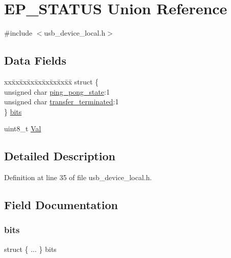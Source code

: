 \hypertarget{union_e_p___s_t_a_t_u_s}{}\section{E\+P\+\_\+\+S\+T\+A\+T\+US Union Reference}
\label{union_e_p___s_t_a_t_u_s}


{\ttfamily \#include $<$usb\+\_\+device\+\_\+local.\+h$>$}

\subsection*{Data Fields}
\begin{DoxyCompactItemize}
\item 
\begin{tabbing}
xx\=xx\=xx\=xx\=xx\=xx\=xx\=xx\=xx\=\kill
struct \{\\
\>unsigned char \mbox{\hyperlink{union_e_p___s_t_a_t_u_s_af0b1bd7b5767b174b8f055d94cac4bcc}{ping\_pong\_state}}:1\\
\>unsigned char \mbox{\hyperlink{union_e_p___s_t_a_t_u_s_a4a20792b6382277d34763fd0157c9f2e}{transfer\_terminated}}:1\\
\} \mbox{\hyperlink{union_e_p___s_t_a_t_u_s_a0ed91666268b2ab8c20a8732c3b99890}{bits}}\\

\end{tabbing}\item 
uint8\+\_\+t \mbox{\hyperlink{union_e_p___s_t_a_t_u_s_aa0c179f4462bb12ca1ed40d18c89cda1}{Val}}
\end{DoxyCompactItemize}


\subsection{Detailed Description}


Definition at line 35 of file usb\+\_\+device\+\_\+local.\+h.



\subsection{Field Documentation}
\mbox{\label{union_e_p___s_t_a_t_u_s_a0ed91666268b2ab8c20a8732c3b99890}} 
\subsubsection{\texorpdfstring{bits}{bits}}
{\footnotesize\ttfamily struct \{ ... \}   bits}

